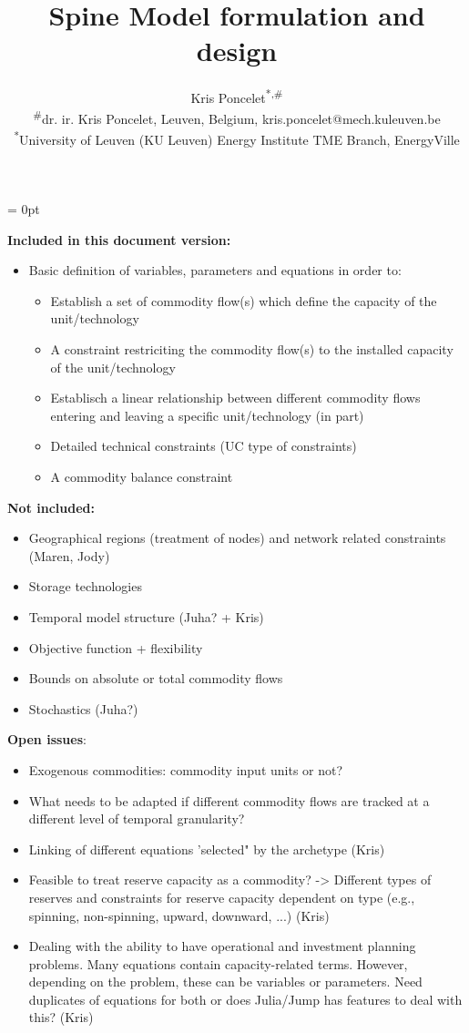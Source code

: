 \documentclass[10pt,english]{article}
\title{Spine Model formulation and design}
\date{}
\author{Kris Poncelet\textsuperscript{*,\#}\\ 
{\small \textsuperscript{\#}dr. ir. Kris Poncelet, Leuven, Belgium, kris.poncelet@mech.kuleuven.be} \\
{\small \textsuperscript{*}University of Leuven (KU Leuven) Energy Institute TME Branch, EnergyVille}}
\begin{document}
\voffset = 0pt

\maketitle{}


\textbf{Included in this document version:}
\begin{itemize}
\item Basic definition of variables, parameters and equations in order to:
\begin{itemize}
\item Establish a set of commodity flow(s) which define the capacity of the unit/technology 
\item A constraint restriciting the commodity flow(s) to the installed capacity of the unit/technology
\item Establisch a linear relationship between different commodity flows entering and leaving a specific unit/technology (in part)
\item Detailed technical constraints (UC type of constraints)
\item A commodity balance constraint
\end{itemize} 
\end{itemize} 


\textbf{Not included:}
\begin{itemize}
\item Geographical regions (treatment of nodes) and network related constraints (Maren, Jody)
\item Storage technologies
\item Temporal model structure (Juha? + Kris)
\item Objective function + flexibility
\item Bounds on absolute or total commodity flows
\item Stochastics (Juha?)
\end{itemize} 

\textbf{Open issues}: 
\begin{itemize}
\item Exogenous commodities: commodity input units or not?
\item What needs to be adapted if different commodity flows are tracked at a different level of temporal granularity?
\item Linking of different equations 'selected" by the archetype (Kris)
\item Feasible to treat reserve capacity as a commodity? -> Different types of reserves and constraints for reserve capacity dependent on type (e.g., spinning, non-spinning, upward, downward, ...) (Kris)
\item Dealing with the ability to have operational and investment planning problems. Many equations contain capacity-related terms. However, depending on the problem, these can be variables or parameters. Need duplicates of equations for both or does Julia/Jump has features to deal with this? (Kris)
\end{itemize}
\end{document}
